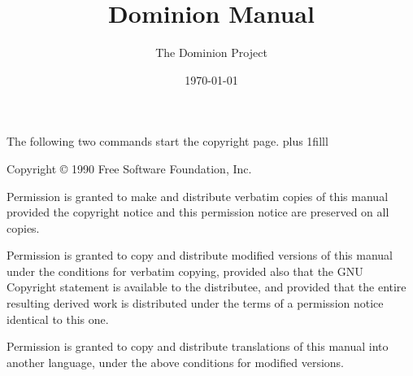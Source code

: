 \pagestyle{headings}




\comment %
\comment %

\begin{tex}
\pagestyle{empty}
\title{Dominion Manual}

\author{The Dominion Project}

\date{\today}

\maketitle
\pagestyle{headings}
\tableofcontents

\comment  The following two commands start the copyright page.
\clearpage
\comment \vskip 0pt plus 1filll

Copyright \copyright{} 1990 Free Software Foundation, Inc.

Permission is granted to make and distribute verbatim copies of this manual
provided the copyright notice and this permission notice are preserved on
all copies.

Permission is granted to copy and distribute modified versions of this
manual under the conditions for verbatim copying, provided also that the
GNU Copyright statement is available to the distributee, and provided that
the entire resulting derived work is distributed under the terms of a
permission notice identical to this one.

Permission is granted to copy and distribute translations of this manual
into another language, under the above conditions for modified versions.

\clearpage
\end{tex}

